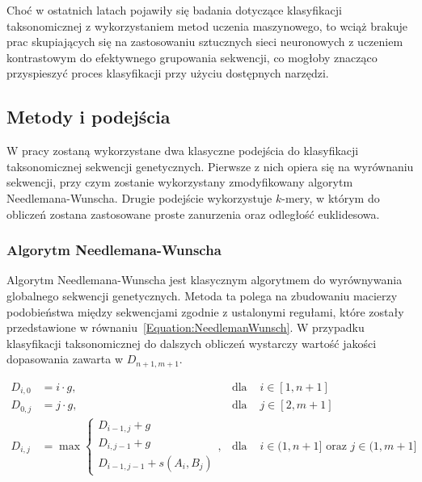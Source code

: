         Choć w ostatnich latach pojawiły się badania dotyczące klasyfikacji taksonomicznej z wykorzystaniem metod uczenia maszynowego, to wciąż brakuje prac skupiających się na zastosowaniu sztucznych sieci neuronowych z uczeniem kontrastowym do efektywnego grupowania sekwencji, co mogłoby znacząco przyspieszyć proces klasyfikacji przy użyciu dostępnych narzędzi.

    \subsection{Metody i podejścia}

        W pracy zostaną wykorzystane dwa klasyczne podejścia do klasyfikacji taksonomicznej sekwencji genetycznych. Pierwsze z nich opiera się na wyrównaniu sekwencji, przy czym zostanie wykorzystany zmodyfikowany algorytm Needlemana-Wunscha. Drugie podejście wykorzystuje $k$-mery, w którym do obliczeń zostana zastosowane proste zanurzenia oraz odległość euklidesowa.

        \subsubsection{Algorytm Needlemana-Wunscha}

            Algorytm Needlemana-Wunscha jest klasycznym algorytmem do wyrównywania globalnego sekwencji genetycznych. Metoda ta polega na zbudowaniu macierzy podobieństwa między sekwencjami zgodnie z ustalonymi regułami, które zostały przedstawione w równaniu~\eqref{Equation:NeedlemanWunsch}. W przypadku klasyfikacji taksonomicznej do dalszych obliczeń wystarczy wartość jakości dopasowania zawarta w $D_{n + 1, m + 1}$.

            \begin{equation}
                \begin{aligned}
                    D_{i,0} &= i \cdot g, & \text{dla } & i \in [1, n + 1] \\
                    D_{0,j} &= j \cdot g, & \text{dla } & j \in [2, m + 1] \\
                    D_{i,j} &= \max
                    \begin{cases}
                        D_{i - 1, j} + g \\
                        D_{i, j - 1} + g \\
                        D_{i - 1, j - 1} + s(A_i, B_j)
                    \end{cases}, & \text{dla } & i \in (1, n + 1] \text{ oraz } j \in (1, m + 1]
                \end{aligned}
                \label{Equation:NeedlemanWunsch}
            \end{equation}

